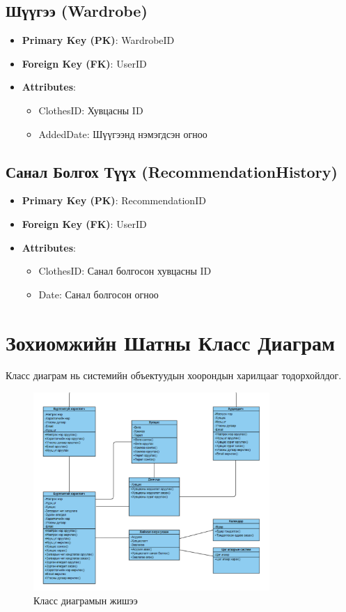 \subsection{Шүүгээ (Wardrobe)}
\begin{itemize}
    \item \textbf{Primary Key (PK)}: WardrobeID
    \item \textbf{Foreign Key (FK)}: UserID
    \item \textbf{Attributes}:
    \begin{itemize}
        \item ClothesID: Хувцасны ID
        \item AddedDate: Шүүгээнд нэмэгдсэн огноо
    \end{itemize}
\end{itemize}

\subsection{Санал Болгох Түүх (RecommendationHistory)}
\begin{itemize}
    \item \textbf{Primary Key (PK)}: RecommendationID
    \item \textbf{Foreign Key (FK)}: UserID
    \item \textbf{Attributes}:
    \begin{itemize}
        \item ClothesID: Санал болгосон хувцасны ID
        \item Date: Санал болгосон огноо
    \end{itemize}
\end{itemize}

\section{Зохиомжийн Шатны Класс Диаграм}
Класс диаграм нь системийн объектуудын хоорондын харилцааг тодорхойлдог. 

\begin{figure}[h!]
    \centering
    \includegraphics[width=0.8\textwidth]{figures/Screenshot 2024-12-12 at 17.15.40.png}
    \caption{Класс диаграмын жишээ}
    \label{fig:class-diagram}
\end{figure}
